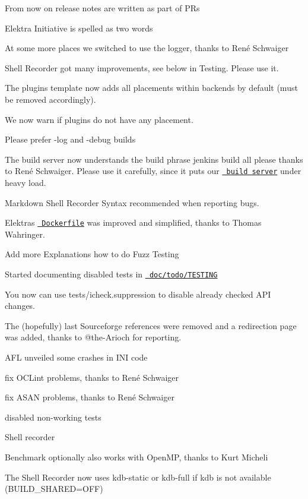 \begin{DoxyItemize}
\item From now on release notes are written as part of P\+Rs
\item Elektra Initiative is spelled as two words
\item At some more places we switched to use the logger, thanks to René Schwaiger
\item Shell Recorder got many improvements, see below in Testing. Please use it.
\item The plugin\textquotesingle{}s template now adds all placements within backends by default (must be removed accordingly).
\item We now warn if plugins do not have any placement.
\item Please prefer -\/log and -\/debug builds
\item The build server now understands the build phrase {\ttfamily jenkins build all please} thanks to René Schwaiger. Please use it carefully, since it puts our \href{https://build.libelektra.org/}{\texttt{ build server}} under heavy load.
\item Markdown Shell Recorder Syntax recommended when reporting bugs.
\item Elektra\textquotesingle{}s \href{https://master.libelektra.org/scripts/docker/legacy/Dockerfile}{\texttt{ Dockerfile}} was improved and simplified, thanks to Thomas Wahringer.
\item Add more Explanations how to do Fuzz Testing
\item Started documenting disabled tests in \href{https://master.libelektra.org/doc/todo/TESTING}{\texttt{ doc/todo/\+T\+E\+S\+T\+I\+NG}}
\item You now can use {\ttfamily tests/icheck.\+suppression} to disable already checked A\+PI changes.
\item The (hopefully) last Sourceforge references were removed and a redirection page was added, thanks to @the-\/Arioch for reporting.
\end{DoxyItemize}


\begin{DoxyItemize}
\item A\+FL unveiled some crashes in I\+NI code
\item fix O\+C\+Lint problems, thanks to René Schwaiger
\item fix A\+S\+AN problems, thanks to René Schwaiger
\item disabled non-\/working tests
\item Shell recorder
\item Benchmark optionally also works with Open\+MP, thanks to Kurt Micheli
\item The Shell Recorder now uses {\ttfamily kdb-\/static} or {\ttfamily kdb-\/full} if {\ttfamily kdb} is not available ({\ttfamily B\+U\+I\+L\+D\+\_\+\+S\+H\+A\+R\+ED=O\+FF})
\end{DoxyItemize}


